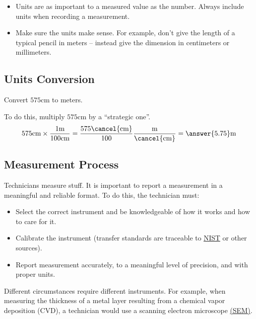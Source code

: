 \documentclass{ximera}
\begin{document}
\begin{warning}
\begin{itemize}
    \item Units are as important to a measured value as the number. Always include units when recording a measurement. 
\item Make sure the units make sense. For example, don’t give the length of a typical pencil in meters -- instead give the dimension in centimeters or millimeters.
\end{itemize}
\end{warning}

 \subsection*{Units Conversion}

 \begin{example}\label{ex:unitConversion}
     Convert $575$cm to meters. 
     \begin{explanation}
     To do this, multiply $575$cm by a “strategic one”.  
$$575\text{cm}\times \frac{1\text{m}}{100\text{cm}}=\frac{575\cancel{\text{cm}}}{100}\frac{\text{m}}{\cancel{\text{cm}}}=\answer{5.75}\text{m}$$
     \end{explanation}
 \end{example}

 \subsection*{Measurement Process}
 Technicians measure stuff.  It is important to report a measurement in a meaningful and reliable format.
To do this, the technician must:
\begin{itemize}
\item Select the correct instrument and be knowledgeable of how it works and how to care for it.
\item Calibrate the instrument (transfer standards are traceable to \href{https://www.nist.gov/}{NIST} or other sources).
\item Report  measurement accurately, to a meaningful level of precision, and with proper units.
\end{itemize}

Different circumstances require different instruments.  For example, when measuring the thickness of a metal layer resulting from a chemical vapor deposition (CVD), a technician would use a scanning electron microscope \href{https://www.nist.gov/news-events/news/2023/05/leveling-sem-measurements-chip-manufacturing}{(SEM)}.  
\end{document}
